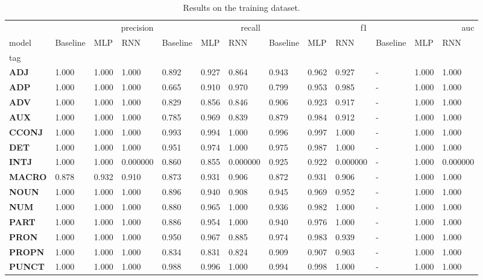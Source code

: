 \begin{table}
\caption{Results on the training dataset.}
\label{tab::ex_2_train}
\begin{tabular}{|l||l||l||l||l||l||l||l||l||l||l||l||l|}
\toprule
 & \multicolumn{3}{r}{precision} & \multicolumn{3}{r}{recall} & \multicolumn{3}{r}{f1} & \multicolumn{3}{r}{auc} \\
model & Baseline & MLP & RNN & Baseline & MLP & RNN & Baseline & MLP & RNN & Baseline & MLP & RNN \\
tag &  &  &  &  &  &  &  &  &  &  &  &  \\
\midrule
\textbf{ADJ} & 1.000 & 1.000 & 1.000 & 0.892 & 0.927 & 0.864 & 0.943 & 0.962 & 0.927 & - & 1.000 & 1.000 \\
\textbf{ADP} & 1.000 & 1.000 & 1.000 & 0.665 & 0.910 & 0.970 & 0.799 & 0.953 & 0.985 & - & 1.000 & 1.000 \\
\textbf{ADV} & 1.000 & 1.000 & 1.000 & 0.829 & 0.856 & 0.846 & 0.906 & 0.923 & 0.917 & - & 1.000 & 1.000 \\
\textbf{AUX} & 1.000 & 1.000 & 1.000 & 0.785 & 0.969 & 0.839 & 0.879 & 0.984 & 0.912 & - & 1.000 & 1.000 \\
\textbf{CCONJ} & 1.000 & 1.000 & 1.000 & 0.993 & 0.994 & 1.000 & 0.996 & 0.997 & 1.000 & - & 1.000 & 1.000 \\
\textbf{DET} & 1.000 & 1.000 & 1.000 & 0.951 & 0.974 & 1.000 & 0.975 & 0.987 & 1.000 & - & 1.000 & 1.000 \\
\textbf{INTJ} & 1.000 & 1.000 & 0.000000 & 0.860 & 0.855 & 0.000000 & 0.925 & 0.922 & 0.000000 & - & 1.000 & 0.000000 \\
\textbf{MACRO} & 0.878 & 0.932 & 0.910 & 0.873 & 0.931 & 0.906 & 0.872 & 0.931 & 0.906 & - & 1.000 & 1.000 \\
\textbf{NOUN} & 1.000 & 1.000 & 1.000 & 0.896 & 0.940 & 0.908 & 0.945 & 0.969 & 0.952 & - & 1.000 & 1.000 \\
\textbf{NUM} & 1.000 & 1.000 & 1.000 & 0.880 & 0.965 & 1.000 & 0.936 & 0.982 & 1.000 & - & 1.000 & 1.000 \\
\textbf{PART} & 1.000 & 1.000 & 1.000 & 0.886 & 0.954 & 1.000 & 0.940 & 0.976 & 1.000 & - & 1.000 & 1.000 \\
\textbf{PRON} & 1.000 & 1.000 & 1.000 & 0.950 & 0.967 & 0.885 & 0.974 & 0.983 & 0.939 & - & 1.000 & 1.000 \\
\textbf{PROPN} & 1.000 & 1.000 & 1.000 & 0.834 & 0.831 & 0.824 & 0.909 & 0.907 & 0.903 & - & 1.000 & 1.000 \\
\textbf{PUNCT} & 1.000 & 1.000 & 1.000 & 0.988 & 0.996 & 1.000 & 0.994 & 0.998 & 1.000 & - & 1.000 & 1.000 \\

\end{tabular}
\end{table}
